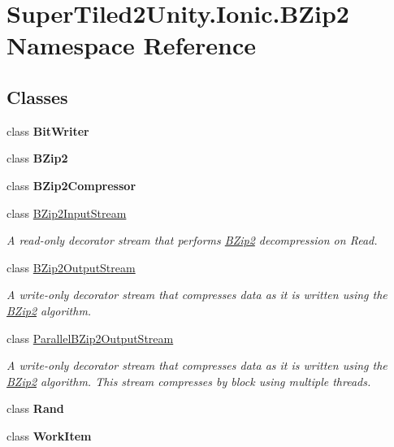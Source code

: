 \hypertarget{namespace_super_tiled2_unity_1_1_ionic_1_1_b_zip2}{}\section{Super\+Tiled2\+Unity.\+Ionic.\+B\+Zip2 Namespace Reference}
\label{namespace_super_tiled2_unity_1_1_ionic_1_1_b_zip2}
\subsection*{Classes}
\begin{DoxyCompactItemize}
\item 
class {\bfseries Bit\+Writer}
\item 
class {\bfseries B\+Zip2}
\item 
class {\bfseries B\+Zip2\+Compressor}
\item 
class \mbox{\hyperlink{class_super_tiled2_unity_1_1_ionic_1_1_b_zip2_1_1_b_zip2_input_stream}{B\+Zip2\+Input\+Stream}}
\begin{DoxyCompactList}\small\item\em A read-\/only decorator stream that performs \mbox{\hyperlink{namespace_super_tiled2_unity_1_1_ionic_1_1_b_zip2}{B\+Zip2}} decompression on Read. \end{DoxyCompactList}\item 
class \mbox{\hyperlink{class_super_tiled2_unity_1_1_ionic_1_1_b_zip2_1_1_b_zip2_output_stream}{B\+Zip2\+Output\+Stream}}
\begin{DoxyCompactList}\small\item\em A write-\/only decorator stream that compresses data as it is written using the \mbox{\hyperlink{namespace_super_tiled2_unity_1_1_ionic_1_1_b_zip2}{B\+Zip2}} algorithm. \end{DoxyCompactList}\item 
class \mbox{\hyperlink{class_super_tiled2_unity_1_1_ionic_1_1_b_zip2_1_1_parallel_b_zip2_output_stream}{Parallel\+B\+Zip2\+Output\+Stream}}
\begin{DoxyCompactList}\small\item\em A write-\/only decorator stream that compresses data as it is written using the \mbox{\hyperlink{namespace_super_tiled2_unity_1_1_ionic_1_1_b_zip2}{B\+Zip2}} algorithm. This stream compresses by block using multiple threads. \end{DoxyCompactList}\item 
class {\bfseries Rand}
\item 
class {\bfseries Work\+Item}
\end{DoxyCompactItemize}
